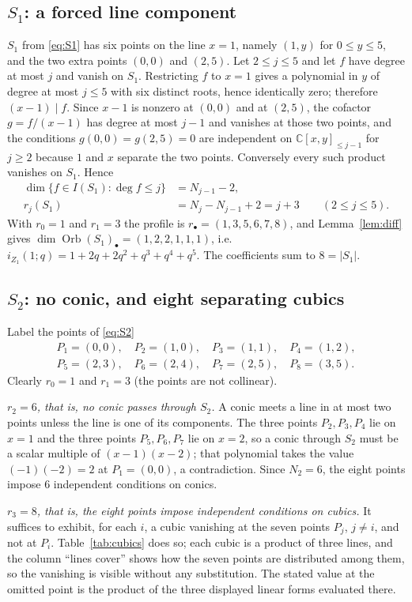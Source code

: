\documentclass[11pt]{amsart}
\theoremstyle{definition}
\newcommand{\C}{\mathbb C}
\newcommand{\Orb}{\operatorname{Orb}}
\newcommand{\Zone}{Z_1}
\begin{document}
\subsection*{$S_1$: a forced line component}
$S_1$ from \eqref{eq:S1} has six points on the line $x=1$, namely $(1,y)$ for $0\le y\le5$, and
the two extra points $(0,0)$ and $(2,5)$. Let $2\le j\le5$ and let $f$ have degree at most $j$
and vanish on $S_1$. Restricting $f$ to $x=1$ gives a polynomial in $y$ of degree at most
$j\le5$ with six distinct roots, hence identically zero; therefore $(x-1)\mid f$. Since $x-1$ is
nonzero at $(0,0)$ and at $(2,5)$, the cofactor $g=f/(x-1)$ has degree at most $j-1$ and
vanishes at those two points, and the conditions $g(0,0)=g(2,5)=0$ are independent on
$\C[x,y]_{\le j-1}$ for $j\ge2$ because $1$ and $x$ separate the two points. Conversely every
such product vanishes on $S_1$. Hence
\begin{align*}
 \dim\{f\in I(S_1):\deg f\le j\}&=N_{j-1}-2,\\
 r_j(S_1)&=N_j-N_{j-1}+2=j+3
 \qquad(2\le j\le5).
\end{align*}
With $r_0=1$ and $r_1=3$ the profile is $r_\bullet=(1,3,5,6,7,8)$, and Lemma~\ref{lem:diff}
gives $\dim\Orb(S_1)_\bullet=(1,2,2,1,1,1)$, i.e.
$i_{\Zone}(1;q)=1+2q+2q^2+q^3+q^4+q^5$. The coefficients sum to $8=|S_1|$.

\subsection*{$S_2$: no conic, and eight separating cubics}
Label the points of \eqref{eq:S2}
\begin{gather*}
 P_1=(0,0),\quad P_2=(1,0),\quad P_3=(1,1),\quad P_4=(1,2),\\
 P_5=(2,3),\quad P_6=(2,4),\quad P_7=(2,5),\quad P_8=(3,5).
\end{gather*}
Clearly $r_0=1$ and $r_1=3$ (the points are not collinear).

\emph{$r_2=6$, that is, no conic passes through $S_2$.} A conic meets a line in at most two
points unless the line is one of its components. The three points $P_2,P_3,P_4$ lie on $x=1$ and
the three points $P_5,P_6,P_7$ lie on $x=2$, so a conic through $S_2$ must be a scalar multiple
of $(x-1)(x-2)$; that polynomial takes the value $(-1)(-2)=2$ at $P_1=(0,0)$, a contradiction.
Since $N_2=6$, the eight points impose $6$ independent conditions on conics.

\emph{$r_3=8$, that is, the eight points impose independent conditions on cubics.} It suffices to
exhibit, for each $i$, a cubic vanishing at the seven points $P_j$, $j\ne i$, and not at $P_i$.
Table~\ref{tab:cubics} does so; each cubic is a product of three lines, and the column ``lines
cover'' shows how the seven points are distributed among them, so the vanishing is visible
without any substitution. The stated value at the omitted point is the product of the three
displayed linear forms evaluated there.
\end{document}
